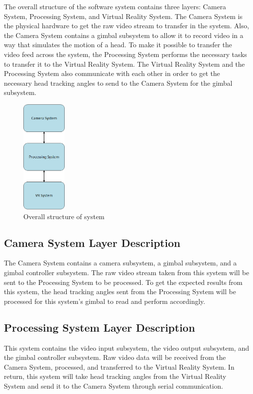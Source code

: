 The overall structure of the software system contains three layers: Camera System, Processing System, and Virtual Reality System. The Camera System is the physical hardware to get the raw video stream to transfer in the system. Also, the Camera System contains a gimbal subsystem to allow it to record video in a way that simulates the motion of a head. To make it possible to transfer the video feed across the system, the Processing System performs the necessary tasks to transfer it to the Virtual Reality System. The Virtual Reality System and the Processing System also communicate with each other in order to get the necessary head tracking angles to send to the Camera System for the gimbal subsystem.

\begin{figure}[h!]
	\centering
 	\includegraphics[width=0.2\textwidth]{images/systemoverview}
	\caption{Overall structure of system}
\end{figure}

\subsection{Camera System Layer Description}
The Camera System contains a camera subsystem, a gimbal subsystem, and a gimbal controller subsystem. The raw video stream taken from this system will be sent to the Processing System to be processed. To get the expected results from this system, the head tracking angles sent from the Processing System will be processed for this system's gimbal to read and perform accordingly.

\subsection{Processing System Layer Description}
This system contains the video input subsystem, the video output subsystem, and the gimbal controller subsystem. Raw video data will be received from the Camera System, processed, and transferred to the Virtual Reality System. In return, this system will take head tracking angles from the Virtual Reality System and send it to the Camera System through serial communication.

